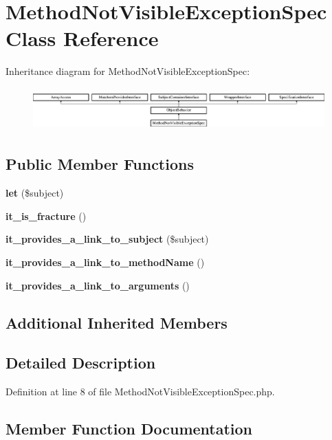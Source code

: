 \section{Method\+Not\+Visible\+Exception\+Spec Class Reference}
\label{classspec_1_1_php_spec_1_1_exception_1_1_fracture_1_1_method_not_visible_exception_spec}
Inheritance diagram for Method\+Not\+Visible\+Exception\+Spec\+:\begin{figure}[H]
\begin{center}
\leavevmode
\includegraphics[height=1.655172cm]{classspec_1_1_php_spec_1_1_exception_1_1_fracture_1_1_method_not_visible_exception_spec}
\end{center}
\end{figure}
\subsection*{Public Member Functions}
\begin{DoxyCompactItemize}
\item 
{\bf let} (\$subject)
\item 
{\bf it\+\_\+is\+\_\+fracture} ()
\item 
{\bf it\+\_\+provides\+\_\+a\+\_\+link\+\_\+to\+\_\+subject} (\$subject)
\item 
{\bf it\+\_\+provides\+\_\+a\+\_\+link\+\_\+to\+\_\+method\+Name} ()
\item 
{\bf it\+\_\+provides\+\_\+a\+\_\+link\+\_\+to\+\_\+arguments} ()
\end{DoxyCompactItemize}
\subsection*{Additional Inherited Members}


\subsection{Detailed Description}


Definition at line 8 of file Method\+Not\+Visible\+Exception\+Spec.\+php.



\subsection{Member Function Documentation}
